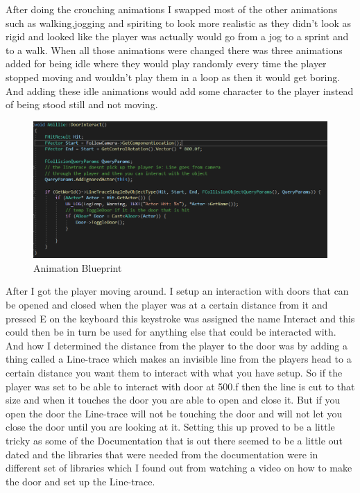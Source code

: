After doing the crouching animations I swapped most of the other animations such as walking,jogging and spiriting to look more realistic as they didn't look as rigid and looked like the player was actually would go from a jog to a sprint and to a walk. When all those animations were changed there was three  animations added for being idle where they would play randomly every time the player stopped moving and wouldn't play them in a loop as then it would get boring. And adding these idle animations would add some character to the player instead of being stood still and not moving.
\begin{figure}[H]
    \centering
    \includegraphics[scale=.6]{img/DoorInteract.PNG}
    \caption{Animation Blueprint}
    \label{Crouch_BP}
\end{figure}
After I got the player moving around. I setup an interaction with doors that can be opened and closed when the player was at a certain distance from it and pressed E on the keyboard this keystroke was assigned the name Interact and this could then be in turn be used for anything else that could be interacted with. And how I determined the distance from the player to the door was by adding a thing called a Line-trace which makes an invisible line from the players head to a certain distance you want them to interact with what you have setup. So if the player was set to be able to interact with door at 500.f then the line is cut to that size and when it touches the door you are able to open and close it. But if you open the door the Line-trace will not be touching the door and will not let you close the door until you are looking at it.
\newline
\newline
Setting this up proved to be a little tricky as some of the Documentation that is out there seemed to be a little out dated and the libraries that were needed from the documentation were in different set of libraries which I found out from watching a video on how to make the door and set up the Line-trace.
